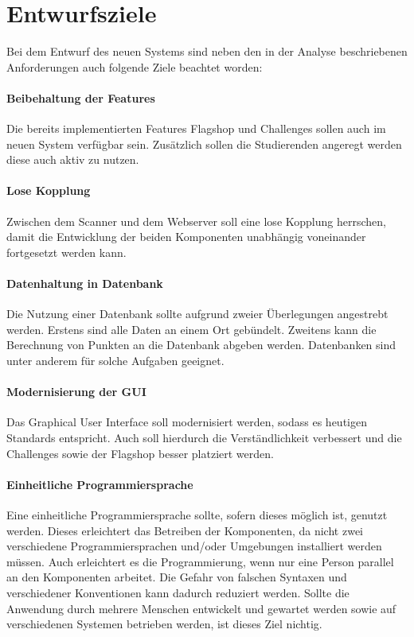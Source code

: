 \section{Entwurfsziele} \label{sec:Entwurfsziele}

Bei dem Entwurf des neuen Systems sind neben den in der Analyse beschriebenen Anforderungen auch folgende Ziele beachtet worden:

\paragraph{Beibehaltung der Features}
Die bereits implementierten Features Flagshop und Challenges sollen auch im neuen System verfügbar sein. Zusätzlich sollen die Studierenden angeregt werden diese auch aktiv zu nutzen.

\paragraph{Lose Kopplung}
Zwischen dem Scanner und dem Webserver soll eine lose Kopplung herrschen, damit die Entwicklung der beiden Komponenten unabhängig voneinander fortgesetzt werden kann.

\paragraph{Datenhaltung in Datenbank}
Die Nutzung einer Datenbank sollte aufgrund zweier Überlegungen angestrebt werden. Erstens sind alle Daten an einem Ort gebündelt. Zweitens kann die Berechnung von Punkten an die Datenbank abgeben werden. Datenbanken sind unter anderem für solche Aufgaben geeignet.

\paragraph{Modernisierung der GUI}
Das Graphical User Interface soll modernisiert werden, sodass es heutigen Standards entspricht. Auch soll hierdurch die Verständlichkeit verbessert und die Challenges sowie der Flagshop besser platziert werden.

\paragraph{Einheitliche Programmiersprache}
Eine einheitliche Programmiersprache sollte, sofern dieses möglich ist, genutzt werden. Dieses erleichtert das Betreiben der Komponenten, da nicht zwei verschiedene Programmiersprachen und/oder Umgebungen installiert werden müssen. Auch erleichtert es die Programmierung, wenn nur eine Person parallel an den Komponenten arbeitet. Die Gefahr von falschen Syntaxen und verschiedener Konventionen kann dadurch reduziert werden. Sollte die Anwendung durch mehrere Menschen entwickelt und gewartet werden sowie auf verschiedenen Systemen betrieben werden, ist dieses Ziel nichtig.

